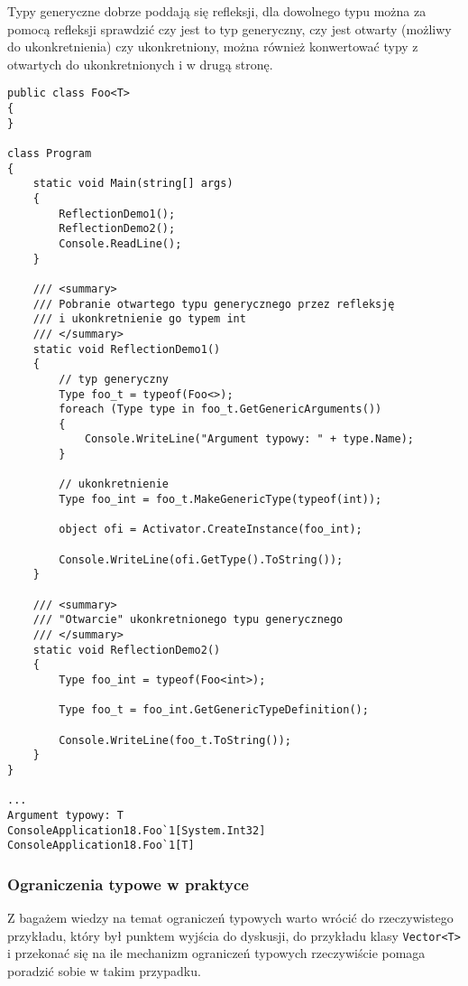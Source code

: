 Typy generyczne dobrze poddają się refleksji, dla dowolnego typu można za pomocą refleksji sprawdzić
czy jest to typ generyczny, czy jest otwarty (możliwy do ukonkretnienia) czy ukonkretniony, można
również konwertować typy z otwartych do ukonkretnionych i w drugą stronę.

\begin{scriptsize}
\begin{verbatim}
public class Foo<T>
{
}

class Program
{
    static void Main(string[] args)
    {
        ReflectionDemo1();
        ReflectionDemo2();
        Console.ReadLine();
    }

    /// <summary>
    /// Pobranie otwartego typu generycznego przez refleksję 
    /// i ukonkretnienie go typem int
    /// </summary>
    static void ReflectionDemo1()
    {
        // typ generyczny
        Type foo_t = typeof(Foo<>);
        foreach (Type type in foo_t.GetGenericArguments())
        {
            Console.WriteLine("Argument typowy: " + type.Name);
        }

        // ukonkretnienie
        Type foo_int = foo_t.MakeGenericType(typeof(int));

        object ofi = Activator.CreateInstance(foo_int);

        Console.WriteLine(ofi.GetType().ToString());
    }

    /// <summary>
    /// "Otwarcie" ukonkretnionego typu generycznego
    /// </summary>
    static void ReflectionDemo2()
    {
        Type foo_int = typeof(Foo<int>);

        Type foo_t = foo_int.GetGenericTypeDefinition();

        Console.WriteLine(foo_t.ToString());
    }
}

...
Argument typowy: T
ConsoleApplication18.Foo`1[System.Int32]
ConsoleApplication18.Foo`1[T]
\end{verbatim}
\end{scriptsize}

\subsubsection{Ograniczenia typowe w praktyce}

Z bagażem wiedzy na temat ograniczeń typowych warto wrócić do rzeczywistego przykładu, który był punktem wyjścia
do dyskusji, do przykładu klasy {\tt Vector<T>} i przekonać się na ile mechanizm ograniczeń typowych rzeczywiście
pomaga poradzić sobie w takim przypadku.

